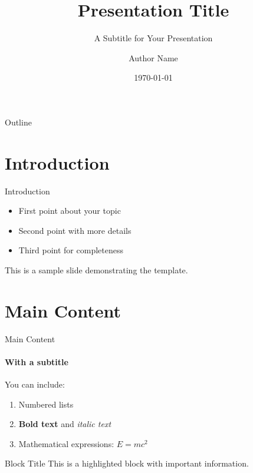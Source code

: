 \documentclass[aspectratio=169]{beamer}
\title{Presentation Title}
\subtitle{A Subtitle for Your Presentation}
\author{Author Name}
\institute{University of Perugia \\ Department of ...}
\date{\today}
\begin{document}
\begin{frame}
    \titlepage
\end{frame}

\begin{frame}{Outline}
    \tableofcontents
\end{frame}

\section{Introduction}

\begin{frame}{Introduction}
    \begin{itemize}
        \item First point about your topic
        \item Second point with more details
        \item Third point for completeness
    \end{itemize}
    \vspace{0.5cm}
    This is a sample slide demonstrating the template.
\end{frame}

\section{Main Content}

\begin{frame}{Main Content}
    \framesubtitle{With a subtitle}
    You can include:
    \begin{enumerate}
        \item Numbered lists
        \item \textbf{Bold text} and \textit{italic text}
        \item Mathematical expressions: $E = mc^2$
    \end{enumerate}
    \vspace{0.5cm}
    \begin{block}{Block Title}
        This is a highlighted block with important information.
    \end{block}
\end{frame}
\end{document}
